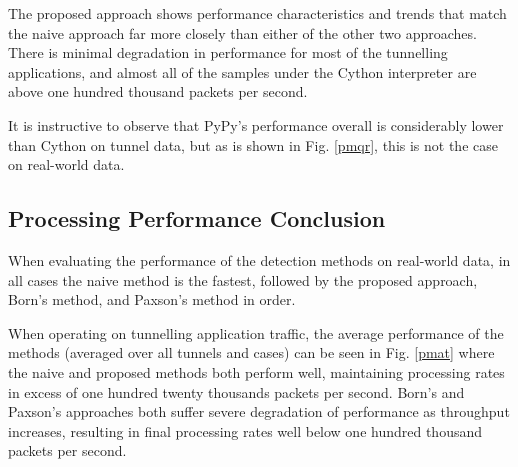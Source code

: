 \documentclass{llncs}
\begin{document}



The proposed approach shows performance characteristics and trends that match
the naive approach far more closely than either of the other two approaches.
There is minimal degradation in performance for most of the tunnelling
applications, and almost all of the samples under the Cython interpreter are
above one hundred thousand packets per second.

It is instructive to observe that PyPy's performance overall is considerably
lower than Cython on tunnel data, but as is shown in Fig. \ref{pmqr}, this is
not the case on real-world data.

\subsection{Processing Performance Conclusion}

When evaluating the performance of the detection methods on real-world data, in all
cases the naive method is the fastest, followed by the proposed approach, Born's
method, and Paxson's method in order.

When operating on tunnelling application traffic, the average performance of the
methods (averaged over all tunnels and cases) can be seen in Fig. \ref{pmat}
where the naive and proposed methods both perform well, maintaining processing
rates in excess of one hundred twenty thousands packets per second. Born's and
Paxson's approaches both suffer severe degradation of performance as throughput
increases, resulting in final processing rates well below one hundred thousand
packets per second.
\end{document}
